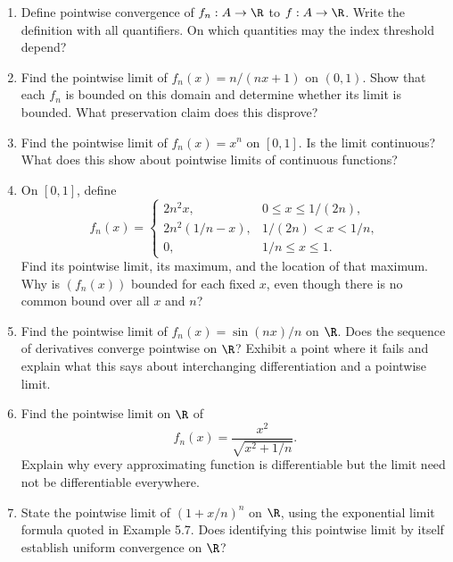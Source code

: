 \begin{enumerate}
  \item Define pointwise convergence of \(f_n:A\to\R\) to
    \(f:A\to\R\). Write the definition with all quantifiers.
    On which quantities may the index threshold depend?

  \item Find the pointwise limit of \(f_n(x)=n/(nx+1)\) on \((0,1)\).
    Show that each \(f_n\) is bounded on this domain and determine
    whether its limit is bounded. What preservation claim does this disprove?

  \item Find the pointwise limit of \(f_n(x)=x^n\) on \([0,1]\).
    Is the limit continuous? What does this show about pointwise
    limits of continuous functions?

  \item On \([0,1]\), define
    \[
      f_n(x)=
      \begin{cases}
        2n^2x,&0\leq x\leq 1/(2n),\\
        2n^2(1/n-x),&1/(2n)<x<1/n,\\
        0,&1/n\leq x\leq1.
      \end{cases}
    \]
    Find its pointwise limit, its maximum, and the location of that
    maximum. Why is \((f_n(x))\) bounded for each fixed \(x\),
    even though there is no common bound over all \(x\) and \(n\)?

  \item Find the pointwise limit of \(f_n(x)=\sin(nx)/n\) on \(\R\).
    Does the sequence of derivatives converge pointwise on \(\R\)?
    Exhibit a point where it fails and explain what this says about
    interchanging differentiation and a pointwise limit.

  \item Find the pointwise limit on \(\R\) of
    \[
      f_n(x)=\frac{x^2}{\sqrt{x^2+1/n}}.
    \]
    Explain why every approximating function is differentiable but
    the limit need not be differentiable everywhere.

  \item State the pointwise limit of \((1+x/n)^n\) on \(\R\),
    using the exponential limit formula quoted in Example 5.7.
    Does identifying this pointwise limit by itself establish uniform
    convergence on \(\R\)?
\end{enumerate}


